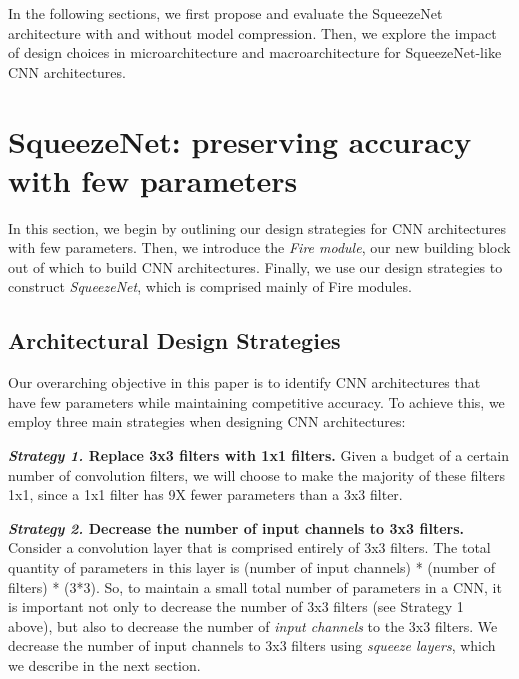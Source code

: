 \documentclass{article} %
\def\vsp{\vspace{-0.15in}}
\begin{document}
In the following sections, we first propose and evaluate the SqueezeNet architecture with and without model compression. 
Then, we explore the impact of design choices in microarchitecture and macroarchitecture for SqueezeNet-like CNN architectures.

\section{SqueezeNet: preserving accuracy with few parameters}
\label{sec:SqueezeNet}
\vsp

In this section, we begin by outlining our design strategies for CNN architectures with few parameters.
Then, we introduce the {\em Fire module}, our new building block out of which to build CNN architectures.
Finally, we use our design strategies to construct {\em SqueezeNet}, which is comprised mainly of Fire modules.

\subsection{Architectural Design Strategies}
\label{sec:design-strategies}
\vsp

Our overarching objective in this paper is to identify CNN architectures that have few parameters while maintaining competitive accuracy. 
To achieve this, we employ three main strategies when designing CNN architectures: 

\noindent
{\bf {\em Strategy 1.} Replace 3x3 filters with 1x1 filters.} 
Given a budget of a certain number of convolution filters, we will choose to make the majority of these filters 1x1, since a 1x1 filter has 9X fewer parameters than a 3x3 filter. 
\vspace{0.1in} %

\noindent
{\bf {\em Strategy 2.} Decrease the number of input channels to 3x3 filters.} 
Consider a convolution layer that is comprised entirely of 3x3 filters. 
The total quantity of parameters in this layer is (number of input channels) * (number of filters) * (3*3). 
So, to maintain a small total number of parameters in a CNN, it is important not only to decrease the number of 3x3 filters (see Strategy 1 above), but also to decrease the number of {\em input channels} to the 3x3 filters. 
We decrease the number of input channels to 3x3 filters using {\em squeeze layers}, which we describe in the next section. 
\vspace{0.05in} %
\end{document}
